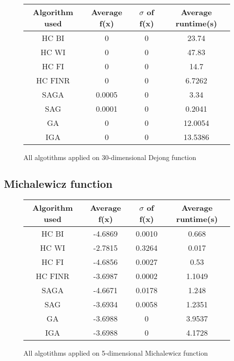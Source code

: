 \documentclass{article}
\begin{document}
\begin{figure}[H]
	\begin{tabular}{|c||c|c|c|} \hline
		Algorithm used & Average f(x) & $\sigma$ of f(x) & Average runtime(s) \\ \hline \hline
		HC BI & 0 & 0 & 23.74 \\ \hline
		HC WI & 0 & 0 & 47.83 \\ \hline
		HC FI & 0 & 0 & 14.7 \\ \hline
		HC FINR & 0 & 0 & 6.7262 \\ \hline
		SAGA & 0.0005 & 0 & 3.34 \\ \hline
		SAG & 0.0001 & 0 & 0.2041 \\ \hline
        GA & 0 & 0 & 12.0054 \\ \hline
		IGA & 0 & 0 & 13.5386 \\ \hline
\end{tabular}
\caption{All algotithms applied on 30-dimensional Dejong function}
\end{figure}

\subsection{Michalewicz function}

\begin{figure}[H]
	\begin{tabular}{|c||c|c|c|} \hline
		Algorithm used & Average f(x) & $\sigma$ of f(x) & Average runtime(s) \\ \hline \hline
		HC BI & -4.6869 & 0.0010 & 0.668 \\ \hline
		HC WI & -2.7815 & 0.3264 & 0.017 \\ \hline
		HC FI & -4.6856 & 0.0027 & 0.53 \\ \hline
		HC FINR & -3.6987 & 0.0002 & 1.1049 \\ \hline
		SAGA & -4.6671 & 0.0178 & 1.248 \\ \hline
		SAG & -3.6934 & 0.0058 & 1.2351 \\ \hline
        GA & -3.6988 & 0 & 3.9537 \\ \hline
		IGA & -3.6988 & 0 & 4.1728 \\ \hline
\end{tabular}
\caption{All algotithms applied on 5-dimensional Michalewicz function}
\end{figure}
\end{document}
